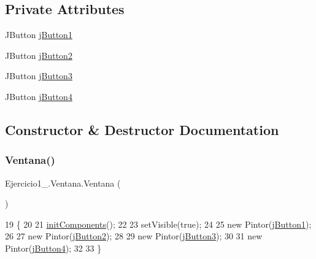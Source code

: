 \subsection*{Private Attributes}
\begin{DoxyCompactItemize}
\item 
J\+Button \mbox{\hyperlink{class_ejercicio1__3_1_1_ventana_a9c2a8cc20df43585485cd2f6f7d54a03}{j\+Button1}}
\item 
J\+Button \mbox{\hyperlink{class_ejercicio1__3_1_1_ventana_a53161bde48e247e8ea1ea2bc6474ec97}{j\+Button2}}
\item 
J\+Button \mbox{\hyperlink{class_ejercicio1__3_1_1_ventana_a41e3718d7909beec7776b977e931a53e}{j\+Button3}}
\item 
J\+Button \mbox{\hyperlink{class_ejercicio1__3_1_1_ventana_a06b0fc7e1c5922e1e6804014d6e3c061}{j\+Button4}}
\end{DoxyCompactItemize}


\subsection{Constructor \& Destructor Documentation}
\mbox{\label{class_ejercicio1__3_1_1_ventana_a8b3bdda1602e80bf9c916f202d07eeee}} 
\subsubsection{\texorpdfstring{Ventana()}{Ventana()}}
{\footnotesize\ttfamily Ejercicio1\+\_.\+Ventana.\+Ventana (\begin{DoxyParamCaption}{ }\end{DoxyParamCaption})\hspace{0.3cm}{\ttfamily [inline]}}


\begin{DoxyCode}
19                      \{
20 
21         \mbox{\hyperlink{class_ejercicio1__3_1_1_ventana_abb545e09b5c15696ac2f99ff5456fbc3}{initComponents}}();
22 
23         setVisible(\textcolor{keyword}{true});
24 
25         \textcolor{keyword}{new} Pintor(\mbox{\hyperlink{class_ejercicio1__3_1_1_ventana_a9c2a8cc20df43585485cd2f6f7d54a03}{jButton1}});
26 
27         \textcolor{keyword}{new} Pintor(\mbox{\hyperlink{class_ejercicio1__3_1_1_ventana_a53161bde48e247e8ea1ea2bc6474ec97}{jButton2}});
28 
29         \textcolor{keyword}{new} Pintor(\mbox{\hyperlink{class_ejercicio1__3_1_1_ventana_a41e3718d7909beec7776b977e931a53e}{jButton3}});
30 
31         \textcolor{keyword}{new} Pintor(\mbox{\hyperlink{class_ejercicio1__3_1_1_ventana_a06b0fc7e1c5922e1e6804014d6e3c061}{jButton4}});
32 
33     \}
\end{DoxyCode}


